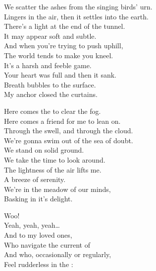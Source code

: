 
We scatter the ashes from the singing birds' urn. \\
Lingers in the air, then it settles into the earth. \\
There's a light at the end of the tunnel. \\
It may appear soft and subtle. \\
And when you're trying to push uphill, \\
The world tends to make you kneel. \\
It's a harsh and feeble game. \\
Your heart was full and then it sank. \\
Breath bubbles to the surface. \\
My anchor closed the curtains. \\


Here comes the  to clear the fog. \\
Here comes a friend for me to lean on. \\
Through the swell, and through the cloud. \\
We're gonna swim out of the sea of doubt. \\

We stand on solid ground. \\
We take the time to look around. \\
The lightness of the air lifts me. \\
A breeze of serenity. \\
We're in the meadow of our minds, \\
Basking in it's delight. \\





Woo! \\
Yeah, yeah, yeah… \\
And to my loved ones, \\
Who navigate the current of  \\
And who, occasionally or regularly, \\
Feel rudderless in the : \\

